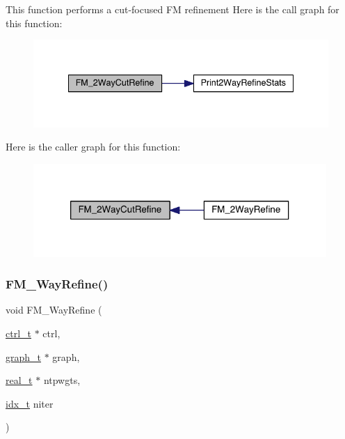 This function performs a cut-\/focused FM refinement Here is the call graph for this function\+:\nopagebreak
\begin{figure}[H]
\begin{center}
\leavevmode
\includegraphics[width=338pt]{a00197_a1c215aad2804a5cba2e54e93113bc0d5_cgraph}
\end{center}
\end{figure}
Here is the caller graph for this function\+:\nopagebreak
\begin{figure}[H]
\begin{center}
\leavevmode
\includegraphics[width=316pt]{a00197_a1c215aad2804a5cba2e54e93113bc0d5_icgraph}
\end{center}
\end{figure}
\mbox{\label{a00197_a1ffe9ee55eb23e345beb5da3e67c501a}} 
\subsubsection{\texorpdfstring{F\+M\+\_\+Way\+Refine()}{FM\_2WayRefine()}}
{\footnotesize\ttfamily void F\+M\+\_\+Way\+Refine (\begin{DoxyParamCaption}\item[{\hyperlink{a00742}{ctrl\+\_\+t} $\ast$}]{ctrl,  }\item[{\hyperlink{a00734}{graph\+\_\+t} $\ast$}]{graph,  }\item[{\hyperlink{a00876_a1924a4f6907cc3833213aba1f07fcbe9}{real\+\_\+t} $\ast$}]{ntpwgts,  }\item[{\hyperlink{a00876_aaa5262be3e700770163401acb0150f52}{idx\+\_\+t}}]{niter }\end{DoxyParamCaption})}

